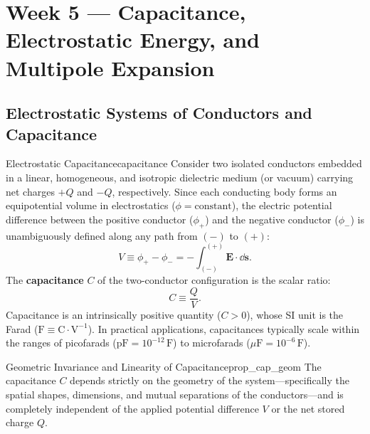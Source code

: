 \section{Week 5 --- Capacitance, Electrostatic Energy, and Multipole Expansion}

\subsection{Electrostatic Systems of Conductors and Capacitance}

\begin{definition}{Electrostatic Capacitance}{capacitance}
Consider two isolated conductors embedded in a linear, homogeneous, and isotropic dielectric medium (or vacuum) carrying net charges \(+Q\) and \(-Q\), respectively. Since each conducting body forms an equipotential volume in electrostatics (\(\phi = \text{constant}\)), the electric potential difference between the positive conductor (\(\phi_+\)) and the negative conductor (\(\phi_-\)) is unambiguously defined along any path from \((-)\) to \((+)\):
\begin{equation}
    V \equiv \phi_+ - \phi_- = -\int_{(-)}^{(+)} \bm{E} \cdot \dd{\bm{s}}.
\end{equation}
The \textbf{capacitance} \(C\) of the two-conductor configuration is the scalar ratio:
\begin{equation}
    C \equiv \frac{Q}{V}.
\end{equation}
Capacitance is an intrinsically positive quantity (\(C > 0\)), whose SI unit is the Farad (\(\text{F} \equiv \text{C}\cdot\text{V}^{-1}\)). In practical applications, capacitances typically scale within the ranges of picofarads (\(\text{pF} = 10^{-12}\,\text{F}\)) to microfarads (\(\mu\text{F} = 10^{-6}\,\text{F}\)).
\end{definition}

\begin{proposition}{Geometric Invariance and Linearity of Capacitance}{prop_cap_geom}
The capacitance \(C\) depends strictly on the geometry of the system---specifically the spatial shapes, dimensions, and mutual separations of the conductors---and is completely independent of the applied potential difference \(V\) or the net stored charge \(Q\).
\end{proposition}

